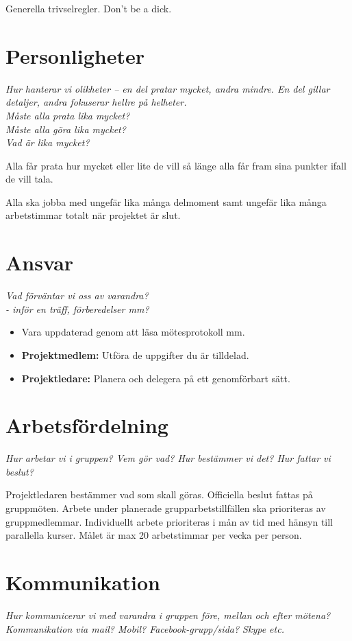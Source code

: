 Generella trivselregler. Don't be a dick.

\section*{Personligheter}
\textit{Hur hanterar vi olikheter – en del pratar mycket, andra mindre. En del gillar detaljer, andra fokuserar hellre på helheter. \\
Måste alla prata lika mycket? \\
Måste alla göra lika mycket? \\
Vad är lika mycket?}

Alla får prata hur mycket eller lite de vill så länge alla får fram sina punkter ifall de vill tala.

Alla ska jobba med ungefär lika många delmoment samt ungefär lika många arbetstimmar totalt när projektet är slut.

\section*{Ansvar}
\textit{Vad förväntar vi oss av varandra? \\
\indent - inför en träff, förberedelser mm?}

\begin{itemize}[noitemsep]
    \item Vara uppdaterad genom att läsa mötesprotokoll mm.
    \item \textbf{Projektmedlem:} Utföra de uppgifter du är tilldelad.
    \item \textbf{Projektledare: } Planera och delegera på ett genomförbart sätt.
\end{itemize}

\section*{Arbetsfördelning}
\textit{Hur arbetar vi i gruppen? Vem gör vad? Hur bestämmer vi det? Hur fattar vi beslut?}

Projektledaren bestämmer vad som skall göras. Officiella beslut fattas på gruppmöten. Arbete under planerade grupparbetstillfällen ska prioriteras av gruppmedlemmar. Individuellt arbete prioriteras i mån av tid med hänsyn till parallella kurser. Målet är max 20 arbetstimmar per vecka per person.

\section*{Kommunikation}
\textit{Hur kommunicerar vi med varandra i gruppen före, mellan och efter mötena? Kommunikation via mail? Mobil? Facebook-grupp/sida? Skype etc.}

